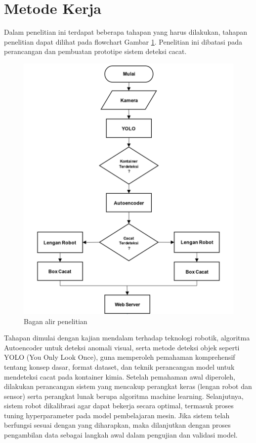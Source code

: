 \vspace{1em}

\section{Metode Kerja}
Dalam penelitian ini terdapat beberapa tahapan yang harus dilakukan,
tahapan penelitian dapat dilihat pada flowchart Gambar
\ref{fig:bagan-alir}. Penelitian ini dibatasi pada perancangan dan
pembuatan prototipe sistem deteksi cacat.
\begin{figure}[H]
  \centering
  \includegraphics[]{gambar/flowchart.jpg}
  \caption{Bagan alir penelitian}
  \label{fig:bagan-alir}
\end{figure}
\vspace{-1em}

Tahapan dimulai dengan kajian mendalam terhadap teknologi robotik,
algoritma Autoencoder untuk deteksi anomali visual, serta metode
deteksi objek seperti YOLO (You Only Look Once), guna memperoleh
pemahaman komprehensif tentang konsep dasar, format dataset, dan
teknik perancangan model untuk mendeteksi cacat pada kontainer kimia.
Setelah pemahaman awal diperoleh, dilakukan perancangan sistem yang
mencakup perangkat keras (lengan robot dan sensor) serta perangkat
lunak berupa algoritma machine learning. Selanjutnya, sistem robot
dikalibrasi agar dapat bekerja secara optimal, termasuk proses tuning
hyperparameter pada model pembelajaran mesin. Jika sistem telah
berfungsi sesuai dengan yang diharapkan, maka dilanjutkan dengan
proses pengambilan data sebagai langkah awal dalam pengujian dan
validasi model.

